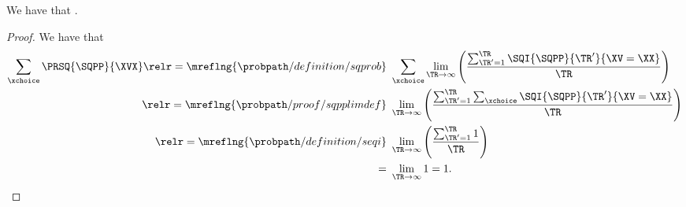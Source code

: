 \begin{proposition}
  We have that \sqprobsumone.%
\end{proposition}

\begin{proof}
  We have that
  \begin{align*}
    \sum_{\xchoice}\PRSQ{\SQPP}{\XVX} 
    \relr = {\mreflng{\probpath/definition/sqprob}} &\ \sum_{\xchoice} \lim_{\TR \rightarrow \infty}\left(\frac{\sum_{\TR' = 1}^{\TR}\SQI{\SQPP}{\TR'}{\XV = \XX}}{\TR}\right)\\
    \relr = {\mreflng{\probpath/proof/sqpplimdef}} &\ \lim_{\TR \rightarrow \infty}\left(\frac{\sum_{\TR' = 1}^{\TR}\sum_{\xchoice}\SQI{\SQPP}{\TR'}{\XV = \XX}}{\TR}\right)\\
    \relr = {\mreflng{\probpath/definition/seqi}} &\ \lim_{\TR \rightarrow \infty}\left(\frac{\sum_{\TR' = 1}^{\TR}1}{\TR}\right)\\
    =  &\ \lim_{\TR \rightarrow \infty}1 = 1.
  \end{align*}
\end{proof}

